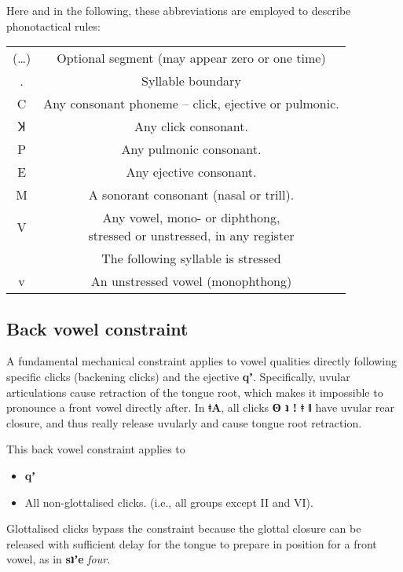 \documentclass[11pt,a5paper]{book}
\newcommand{\qcn}[1]{\textcolor{AccentText}{\large\textbf{#1}}}
\newcommand{\langname}{\qcn{ǂA}}
\newcommand{\transl}[2]{\qcn{#1} \emph{#2}}
\begin{document}
Here and in the following, these abbreviations are employed to describe phonotactical rules:

\begin{center}
\begin{tabular}{cc}
	(\ldots) & Optional segment (may appear zero or one time)\\
	. & Syllable boundary \\
	C & Any consonant phoneme -- click, ejective or pulmonic.\\
	Ʞ & Any click consonant. \\
	P & Any pulmonic consonant. \\
	E & Any ejective consonant.\\
	M & A sonorant consonant (nasal or trill).\\
	V & \makecell{Any vowel, mono- or diphthong, \\stressed or unstressed, in any register} \\
 \stress{} & The following syllable is stressed \\
	v & An unstressed vowel (monophthong) 
\end{tabular}
\end{center}

\subsection{Back vowel constraint}\label{sec:backvowelconstraint}

A fundamental mechanical constraint applies to vowel qualities directly following specific clicks (backening clicks) and the ejective \qcn{qʼ}. Specifically, uvular articulations cause retraction of the tongue root, which makes it impossible to pronounce a front vowel directly after. In \langname, all clicks \qcn{ʘ ʇ ǃ ǂ ǁ} have uvular rear closure, and thus really release uvularly and cause tongue root retraction.

This back vowel constraint applies to

\begin{itemize}
	\item \qcn{qʼ}
	\item All non-glottalised clicks. (i.e., all groups except II and VI).
\end{itemize}

Glottalised clicks bypass the constraint because the glottal closure can be released with sufficient delay for the tongue to prepare in position for a front vowel, as in \transl{sʇʼe}{four}.
\end{document}
